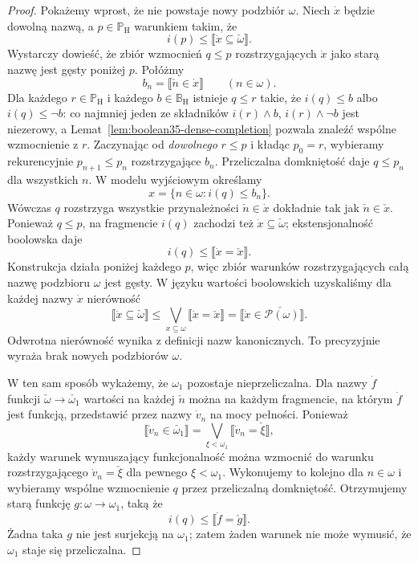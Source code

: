 \begin{proof}
Pokażemy wprost, że nie
powstaje nowy podzbiór
$\omega$. Niech $\dot x$
będzie dowolną nazwą, a
$p\in\mathbb P_{\mathrm H}$
warunkiem takim, że
\[
 i(p)\le\llbracket\dot x
 \subseteq\check\omega\rrbracket.
\]
Wystarczy dowieść, że zbiór
wzmocnień $q\le p$
rozstrzygających $\dot x$
jako starą nazwę jest gęsty
poniżej $p$. Połóżmy
\[
 b_n=\llbracket
       \check n\in\dot x\rrbracket
       \qquad(n\in\omega).
\]
Dla każdego $r\in\mathbb P_{\mathrm H}$
i każdego $b\in\mathbb B_{\mathrm H}$
istnieje $q\le r$ takie,
że $i(q)\le b$ albo
$i(q)\le\neg b$:
co najmniej jeden ze
składników
$i(r)\wedge b$,
$i(r)\wedge\neg b$
jest niezerowy, a
Lemat~\ref{lem:boolean35-dense-completion}
pozwala znaleźć wspólne
wzmocnienie z $r$.
Zaczynając od
\emph{dowolnego} $r\le p$
i kładąc $p_0=r$,
wybieramy rekurencyjnie
$p_{n+1}\le p_n$
rozstrzygające $b_n$.
Przeliczalna domkniętość
daje $q\le p_n$ dla
wszystkich $n$. W modelu
wyjściowym określamy
\[
 x=\{n\in\omega:
        i(q)\le b_n\}.
\]
Wówczas $q$ rozstrzyga
wszystkie przynależności
$\check n\in\dot x$
dokładnie tak jak
$\check n\in\check x$.
Ponieważ $q\le p$,
na fragmencie $i(q)$
zachodzi też
$\dot x\subseteq\check\omega$;
ekstensjonalność boolowska
daje
\[
 i(q)\le\llbracket
      \dot x=\check x\rrbracket.
\]
Konstrukcja działa poniżej
każdego $p$, więc zbiór
warunków rozstrzygających
całą nazwę podzbioru
$\omega$ jest gęsty.
W języku wartości boolowskich
uzyskaliśmy dla każdej
nazwy $\dot x$ nierówność
\[
 \llbracket\dot x\subseteq
      \check\omega\rrbracket
 \le\bigvee_{x\subseteq\omega}
       \llbracket\dot x=\check x\rrbracket
 =\llbracket\dot x\in
       \check{\mathcal P(\omega)}\rrbracket.
\]
Odwrotna nierówność wynika
z definicji nazw kanonicznych.
To precyzyjnie wyraża brak
nowych podzbiorów $\omega$.

W ten sam sposób wykażemy,
że $\omega_1$ pozostaje
nieprzeliczalna. Dla nazwy
$\dot f$ funkcji
$\check\omega\to\check{\omega_1}$
wartości na każdej
$\check n$ można na
każdym fragmencie, na którym
$\dot f$ jest funkcją,
przedstawić przez nazwy
$\dot v_n$ na mocy pełności.
Ponieważ
\[
 \llbracket\dot v_n
       \in\check{\omega_1}\rrbracket
 =\bigvee_{\xi<\omega_1}
   \llbracket\dot v_n
           =\check\xi\rrbracket,
\]
każdy warunek wymuszający
funkcjonalność można wzmocnić
do warunku rozstrzygającego
$\dot v_n=\check\xi$
dla pewnego $\xi<\omega_1$.
Wykonujemy to kolejno dla
$n\in\omega$ i wybieramy
wspólne wzmocnienie $q$
przez przeliczalną domkniętość.
Otrzymujemy starą funkcję
$g:\omega\to\omega_1$,
taką że
\[
 i(q)\le\llbracket
        \dot f=\check g\rrbracket.
\]
Żadna taka $g$ nie jest
surjekcją na $\omega_1$;
zatem żaden warunek
nie może wymusić, że
$\omega_1$ staje się
przeliczalna.


\end{proof}
